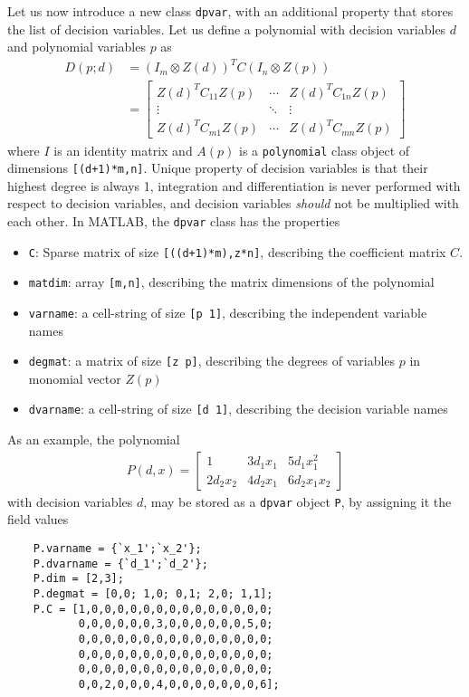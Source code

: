 \documentclass{article}
\newcommand{\bmat}[1]{\begin{bmatrix} #1\end{bmatrix}}
\begin{document}
	Let us now introduce a new class \texttt{dpvar}, with an additional property that stores the list of decision variables. Let us define a polynomial with decision variables $d$ and polynomial variables $p$ as
	\begin{align*}
		D(p;d) &= (I_m \otimes Z(d))^TC (I_n \otimes Z(p))\\
		&=\bmat{Z(d)^T C_{11} Z(p) &\cdots &Z(d)^T C_{1n} Z(p)\\
			\vdots& \ddots &\vdots\\
			Z(d)^T C_{m1} Z(p)& \cdots &Z(d)^T C_{mn} Z(p)}
	\end{align*}
	where $I$ is an identity matrix and $A(p)$ is a \texttt{polynomial} class object of dimensions \texttt{[(d+1)*m,n]}. Unique property of decision variables is that their highest degree is always 1, integration and differentiation is never performed with respect to decision variables, and decision variables \textit{should} not be multiplied with each other.
	In MATLAB, the \texttt{dpvar} class has the properties
	\begin{itemize}
		\item \texttt{C}: Sparse matrix of size \texttt{[((d+1)*m),z*n]}, describing the coefficient matrix $C$.
		\item \texttt{matdim}: array \texttt{[m,n]}, describing the matrix dimensions of the polynomial
		\item \texttt{varname}: a cell-string of size \texttt{[p 1]}, describing the independent variable names
		\item \texttt{degmat}: a matrix of size \texttt{[z p]}, describing the degrees of variables $p$ in monomial vector $Z(p)$
		\item \texttt{dvarname}: a cell-string of size \texttt{[d 1]}, describing the decision variable names
	\end{itemize}
	As an example, the polynomial
	\begin{align*}
	P(d,x)=\bmat{1&3d_1x_1&5d_1x_1^2\\ 2d_2x_2&4d_2x_1&6d_2x_1x_2}
	\end{align*}
	with decision variables $d$, may be stored as a \texttt{dpvar} object \texttt{P}, by assigning it the field values
	\begin{verbatim}
	P.varname = {`x_1';`x_2'};
	P.dvarname = {`d_1';`d_2'};
	P.dim = [2,3];
	P.degmat = [0,0; 1,0; 0,1; 2,0; 1,1];
	P.C = [1,0,0,0,0,0,0,0,0,0,0,0,0,0,0;
	       0,0,0,0,0,0,3,0,0,0,0,0,0,5,0; 
	       0,0,0,0,0,0,0,0,0,0,0,0,0,0,0;
	       0,0,0,0,0,0,0,0,0,0,0,0,0,0,0;
	       0,0,0,0,0,0,0,0,0,0,0,0,0,0,0;
	       0,0,2,0,0,0,4,0,0,0,0,0,0,0,6];
	\end{verbatim}
	
\end{document}
